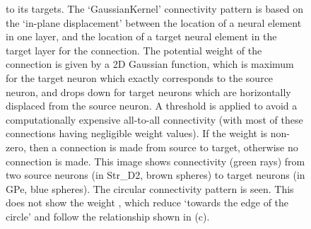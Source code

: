 \documentclass{frontiersSCNS}
\begin{document}
\begin{figure}[t]
{to its targets.  The `GaussianKernel'
connectivity pattern is based on the `in-plane displacement' between
the location of a neural element in one layer, and the location of a
target neural element in the target layer for the connection. The
potential weight of the connection is given by a 2D Gaussian function,
which is maximum for the target neuron which exactly corresponds to
the source neuron, and drops down for target neurons which are
horizontally displaced from the source neuron. A threshold is applied
to avoid a computationally expensive all-to-all connectivity (with
most of these connections having negligible weight values).  If the
weight is non-zero, then a connection is made from source to target,
otherwise no connection is made.  This
image shows connectivity (green rays) from two source neurons (in
Str\_D2, brown spheres) to target neurons (in GPe, blue spheres). The
circular connectivity pattern is seen. This does not show the weight
, which reduce `towards the edge of the circle' and follow the
relationship shown in (c).}
\end{figure}
\end{document}
